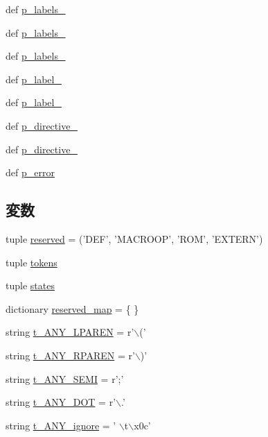\begin{DoxyCompactItemize}
\item 
def \hyperlink{namespacemicro__asm_a9cb8e2ba66d91a1d4dfb7cb3a90c1cf7}{p\_\-labels\_}
\item 
def \hyperlink{namespacemicro__asm_a14c2988a6cdde6544b11178ffa1ac4e1}{p\_\-labels\_}
\item 
def \hyperlink{namespacemicro__asm_a16e86f7b82ae8abcb138c274ff0743b8}{p\_\-labels\_}
\item 
def \hyperlink{namespacemicro__asm_aa02e5ebc42f155c23b13bfd0eb35bd9d}{p\_\-label\_}
\item 
def \hyperlink{namespacemicro__asm_a7e3b6c397967ee0c9f541f8c1b388cd5}{p\_\-label\_}
\item 
def \hyperlink{namespacemicro__asm_a8521fe516e58d23df8a9a00ffa804d91}{p\_\-directive\_}
\item 
def \hyperlink{namespacemicro__asm_a4b5544c13f30d1f1b1be7d9ac1642ae6}{p\_\-directive\_}
\item 
def \hyperlink{namespacemicro__asm_a7e0282385fe8587f1136e99fb97817f2}{p\_\-error}
\end{DoxyCompactItemize}
\subsection*{変数}
\begin{DoxyCompactItemize}
\item 
tuple \hyperlink{namespacemicro__asm_a7c0da508b820c6b4db51430d694f6d8b}{reserved} = ('DEF', 'MACROOP', 'ROM', 'EXTERN')
\item 
tuple \hyperlink{namespacemicro__asm_a8949ccb05d719d97020ab994d6044eef}{tokens}
\item 
tuple \hyperlink{namespacemicro__asm_a998242a7605823c08ad1630923b570d5}{states}
\item 
dictionary \hyperlink{namespacemicro__asm_a2fce270f6ee4bafd620b1b2f00cd9b79}{reserved\_\-map} = \{ \}
\item 
string \hyperlink{namespacemicro__asm_adddd3644d1c96a6ff6c697f82c5c6fe9}{t\_\-ANY\_\-LPAREN} = r'$\backslash$('
\item 
string \hyperlink{namespacemicro__asm_a48eea5b8a8376860f8538dafed3cc105}{t\_\-ANY\_\-RPAREN} = r'$\backslash$)'
\item 
string \hyperlink{namespacemicro__asm_a5a4b0779a63cf66d21e5a48374083ab4}{t\_\-ANY\_\-SEMI} = r';'
\item 
string \hyperlink{namespacemicro__asm_a552c7d03bd35ff56963494e8cdd840c1}{t\_\-ANY\_\-DOT} = r'$\backslash$.'
\item 
string \hyperlink{namespacemicro__asm_a65d7419bbffa21f7c4406f5518092c9b}{t\_\-ANY\_\-ignore} = ' $\backslash$t$\backslash$x0c'
\end{DoxyCompactItemize}


